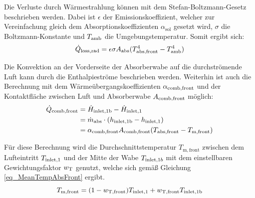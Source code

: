 Die Verluste durch Wärmestrahlung können mit dem Stefan-Boltzmann-Gesetz beschrieben werden.
Dabei ist $\epsilon$ der Emissionskoeffizient, welcher zur Vereinfachung gleich dem Absorptionskoeffizienten $\alpha_{\mathrm{sol}}$ gesetzt wird, $\sigma$ die Boltzmann-Konstante und $T_{\mathrm{amb}}$ die Umgebungstemperatur. Somit ergibt sich:
\begin{equation} \label{eq_StrahlungVerluste}
    \dot{Q}_{\mathrm{loss,rad}} = \epsilon \sigma A_{\mathrm{abs}} (T_{\mathrm{abs,front}}^4-T_{\mathrm{amb}}^4)
\end{equation}

Die Konvektion an der Vorderseite der Absorberwabe auf die durchströmende Luft kann durch die Enthalpieströme beschrieben werden.
Weiterhin ist auch die Berechnung mit dem Wärmeübergangskoeffizienten $\alpha_{\mathrm{comb},\mathrm{front}}$ und der Kontaktfläche zwischen Luft und Absorberwabe $A_{\mathrm{comb},\mathrm{front}}$ möglich:
\begin{equation} \label{eq_gewünschteKonvektion}
    \begin{aligned}
        \dot{Q}_{\mathrm{comb,front}} & = \dot{H}_{\mathrm{inlet,}\mathrm{1b}} - \dot{H}_{\mathrm{inlet,}1}                                              \\
                               & = \dot{m}_{\mathrm{abs}} \cdot ( h_{\mathrm{inlet,}\mathrm{1b}} - h_{\mathrm{inlet,}1})            \\
                               & = \alpha_{\mathrm{comb},\mathrm{front}} A_{\mathrm{comb},\mathrm{front}} (T_{\mathrm{abs,front}}-T_{\mathrm{m,front}})
    \end{aligned}
\end{equation}

Für diese Berechnung wird die Durchschnittstemperatur $T_{\mathrm{m,front}}$ zwischen dem Lufteintritt $T_{\mathrm{inlet,}1}$ und der Mitte der Wabe $T_{\mathrm{inlet,}1b}$ mit dem einstellbaren Gewichtungsfaktor $w_{\mathrm{T}}$ genutzt, welche sich gemäß Gleichung \ref{eq_MeanTempAbsFront} ergibt.
\begin{equation} \label{eq_MeanTempAbsFront}
    T_{\mathrm{m,front}} = (1-w_{\mathrm{T,front}}) T_{\mathrm{inlet,}1} + w_{\mathrm{T,front}} T_{\mathrm{inlet,}\mathrm{1b}}
\end{equation}

